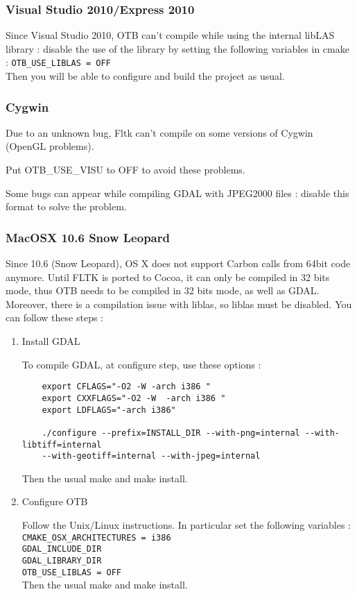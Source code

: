 \subsubsection{Visual Studio 2010/Express 2010}
Since Visual Studio 2010, OTB can't compile while using the internal libLAS library : disable the use of the library by setting 
the following variables in cmake :  \texttt{OTB\_USE\_LIBLAS = OFF}\\
Then you will be able to configure and build the project as usual.

\subsubsection{Cygwin}
Due to an unknown bug, Fltk can't compile on some versions of Cygwin (OpenGL problems).

Put OTB\_USE\_VISU to OFF to avoid these problems.

Some bugs can appear while compiling GDAL with JPEG2000 files : disable this format to solve the problem.

\subsubsection{MacOSX 10.6 Snow Leopard}
Since 10.6 (Snow Leopard), OS X does not support Carbon calls from 64bit code anymore. Until FLTK is ported to Cocoa, it can only be compiled in 32 bits mode, thus OTB needs to be compiled in 32 bits mode, as well as GDAL. Moreover, there is a compilation issue with liblas, so liblas must be disabled.
You can follow these steps :

\begin{enumerate}

\item Install GDAL

	To compile GDAL, at configure step, use these options :
\begin{verbatim}
	export CFLAGS="-O2 -W -arch i386 "
	export CXXFLAGS="-O2 -W  -arch i386 "
	export LDFLAGS="-arch i386"

	./configure --prefix=INSTALL_DIR --with-png=internal --with-libtiff=internal
	--with-geotiff=internal --with-jpeg=internal
\end{verbatim}

	Then the usual make and make install.


\item Configure OTB

        Follow the Unix/Linux instructions. In particular set the following variables :
        \texttt{CMAKE\_OSX\_ARCHITECTURES = i386}\\
        \texttt{GDAL\_INCLUDE\_DIR}\\
        \texttt{GDAL\_LIBRARY\_DIR}\\
        \texttt{OTB\_USE\_LIBLAS = OFF}\\

        Then the usual make and make install.

\end{enumerate}

